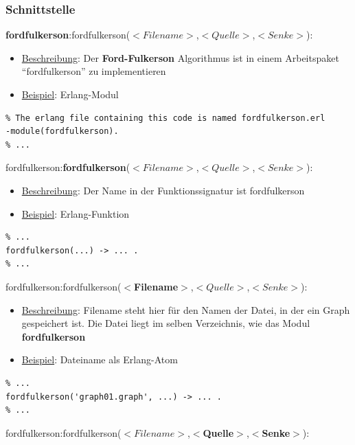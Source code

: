 \documentclass[11pt]{article}
\begin{document}
    \subsubsection{Schnittstelle}
    \textbf{fordfulkerson}:fordfulkerson($<Filename>$,$<Quelle>$,$<Senke>$):\\ 
    \begin{itemize}
        \item \underline{Beschreibung}: Der \textbf{Ford-Fulkerson} Algorithmus ist in einem Arbeitspaket\\ "`fordfulkerson"' zu implementieren
        \item \underline{Beispiel}: Erlang-Modul
    \end{itemize}
\begin{lstlisting}
% The erlang file containing this code is named fordfulkerson.erl
-module(fordfulkerson).
% ...
\end{lstlisting}
    fordfulkerson:\textbf{fordfulkerson}($<Filename>$,$<Quelle>$,$<Senke>$):\\ 
    \begin{itemize}
        \item \underline{Beschreibung}: Der Name in der Funktionssignatur ist fordfulkerson
        \item \underline{Beispiel}: Erlang-Funktion
    \end{itemize}
\begin{lstlisting}
% ...
fordfulkerson(...) -> ... .
% ...
\end{lstlisting}
    fordfulkerson:fordfulkerson($<$\textbf{Filename}$>$,$<Quelle>$,$<Senke>$):\\ 
    \begin{itemize}
        \item \underline{Beschreibung}: Filename steht hier f\"ur den Namen der Datei, in der ein Graph gespeichert ist. Die Datei liegt im selben Verzeichnis, wie das Modul \textbf{fordfulkerson}
        \item \underline{Beispiel}: Dateiname als Erlang-Atom
    \end{itemize}
\begin{lstlisting}
% ...
fordfulkerson('graph01.graph', ...) -> ... .
% ...
\end{lstlisting}
    fordfulkerson:fordfulkerson($<Filename>$,$<$\textbf{Quelle}$>$,$<$\textbf{Senke}$>$):\\ 
\end{document}
